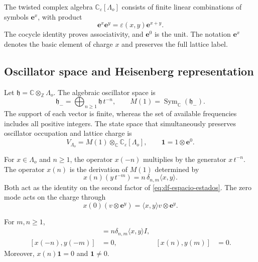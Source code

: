 The twisted complex algebra \(\mathbb C_{\varepsilon}[\Lambda_o]\) consists of finite linear combinations of symbols \(\mathbf e^x\), with product
\begin{equation}
 \mathbf e^x\mathbf e^y=\varepsilon(x,y)\mathbf e^{x+y}.
 \label{eq:df-producto-torcido}
\end{equation}
The cocycle identity proves associativity, and \(\mathbf e^0\) is the unit. The notation \(\mathbf e^x\) denotes the basic element of charge \(x\) and preserves the full lattice label.

\subsection{Oscillator space and Heisenberg representation}
\label{subsec:df-osciladores}


Let \(\mathfrak h=\mathbb C\otimes_{\mathbb Z}\Lambda_o\). The algebraic oscillator space is
\[
 \mathfrak h_-=
 \bigoplus_{n\geq1}\mathfrak h\,t^{-n},
 \qquad
 M(1)=\operatorname{Sym}_{\mathbb C}(\mathfrak h_-).
\]
The support of each vector is finite, whereas the set of available frequencies includes all positive integers. The state space that simultaneously preserves oscillator occupation and lattice charge is
\begin{equation}
 V_{\Lambda_o}=M(1)\otimes_{\mathbb C}
                  \mathbb C_{\varepsilon}[\Lambda_o],
 \qquad \mathbf1=1\otimes\mathbf e^0.
 \label{eq:df-espacio-estados}
\end{equation}

For \(x\in\Lambda_o\) and \(n\geq1\), the operator \(x(-n)\) multiplies by the generator \(x\,t^{-n}\). The operator \(x(n)\) is the derivation of \(M(1)\) determined by
\begin{equation}
 x(n)(y\,t^{-m})=n\,\delta_{n,m}\langle x,y\rangle.
 \label{eq:df-derivacion-oscilatoria}
\end{equation}
Both act as the identity on the second factor of \eqref{eq:df-espacio-estados}. The zero mode acts on the charge through
\[
 x(0)(v\otimes\mathbf e^y)
 =\langle x,y\rangle v\otimes\mathbf e^y.
\]

\begin{theorem}
\label{thm:df-heisenberg}
For \(m,n\geq1\),
\begin{align}
 [x(n),y(-m)]&=n\delta_{n,m}\langle x,y\rangle I,
 \label{eq:df-CCR}\\
 [x(-n),y(-m)]&=0,
 & [x(n),y(m)]&=0.
\end{align}
Moreover, \(x(n)\mathbf1=0\) and \(\mathbf1\ne0\).
\end{theorem}


